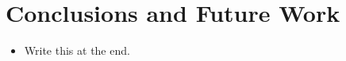 \section{Conclusions and Future Work}
\label{sec:conc}

\begin{itemize}
    \item Write this at the end.
\end{itemize}